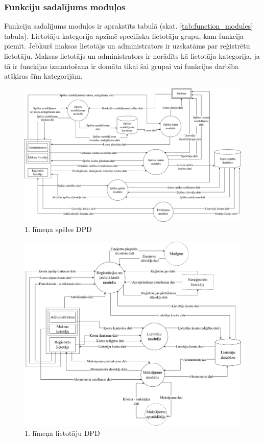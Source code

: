 \subsubsection{Funkciju sadalījums moduļos}
Funkciju sadalījums moduļos ir aprakstīts tabulā (skat. \ref{tab:function_modules} tabula).
Lietotāju kategorija apzīmē specifisku lietotāju grupu, kam funkcija piemīt.
Jebkurš maksas lietotājs un administrators ir uzskatāms par reģistrētu lietotāju.
Maksas lietotājs un administrators ir norādīts kā lietotāja kategorija, ja tā ir funckijas izmantošana ir domāta tikai šai grupai vai funkcijas darbība atšķiras šīm kategorijām.

\begin{figure}[htbp]
	\centering
	\includegraphics[width=\linewidth]{./src/img/1LīmeņaDPDSpēlesDatubāze.png}
	\caption{1. līmeņa spēles DPD}
	\label{fig:dpd-1-game}
\end{figure}

\begin{figure}[htbp]
	\centering
	\includegraphics[width=\linewidth]{./src/img/1LīmeņaDPDLietotājuDatubāze.png}
	\caption{1. līmeņa lietotāju DPD}
	\label{fig:dpd-1-user}
\end{figure}
\eject


